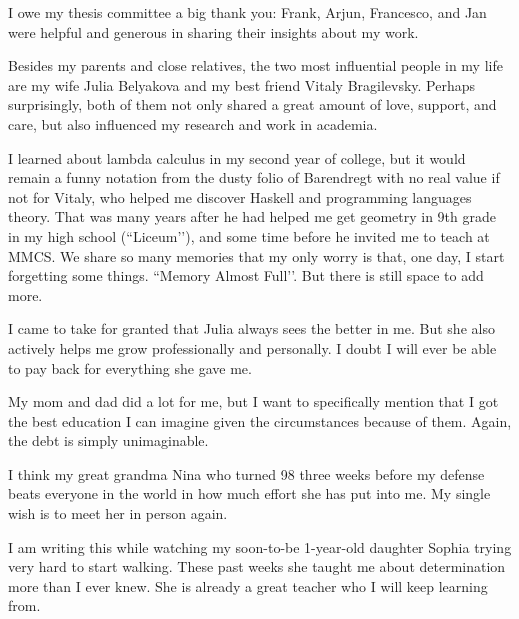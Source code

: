 I owe my thesis committee a big thank you: Frank, Arjun, Francesco, and Jan were helpful and generous in sharing their insights about my work.

Besides my parents and close relatives, the two most influential people in my life are my wife Julia Belyakova and my best friend Vitaly Bragilevsky. Perhaps surprisingly, both of them not only shared a great amount of love, support, and care, but also influenced my research and work in academia.

I learned about lambda calculus in my second year of college, but it would remain a funny notation from the dusty folio of Barendregt with no real value if not for Vitaly, who helped me discover Haskell and programming languages theory. That was many years after he had helped me get geometry in 9th grade in my high school (``Liceum’’), and some time before he invited me to teach at MMCS. We share so many memories that my only worry is that, one day, I start forgetting some things. ``Memory Almost Full’’. But there is still space to add more.

I came to take for granted that Julia always sees the better in me. But she also actively helps me grow professionally and personally. I doubt I will ever be able to pay back for everything she gave me.

My mom and dad did a lot for me, but I want to specifically mention that I got the best education I can imagine given the circumstances because of them. Again, the debt is simply unimaginable.

I think my great grandma Nina who turned 98 three weeks before my defense beats everyone in the world in how much effort she has put into me. My single wish is to meet her in person again.

I am writing this while watching my soon-to-be 1-year-old daughter Sophia trying very hard to start walking. These past weeks she taught me about determination more than I ever knew. She is already a great teacher who I will keep learning from.
